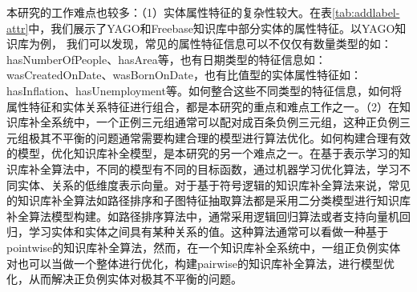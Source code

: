 本研究的工作难点也较多：（1）实体属性特征的复杂性较大。在表\ref{tab:addlabel-attr}中，我们展示了YAGO和Freebase知识库中部分实体的属性特征。以YAGO知识库为例，
我们可以发现，常见的属性特征信息可以不仅仅有数量类型的如：hasNumberOfPeople、hasArea等，也有日期类型的特征信息如：wasCreatedOnDate、wasBornOnDate，也有比值型的实体属性特征如：hasInflation、hasUnemployment等。如何整合这些不同类型的特征信息，如何将属性特征和实体关系特征进行组合，都是本研究的重点和难点工作之一。（2）在知识库补全系统中，一个正例三元组通常可以配对成百条负例三元组，这种正负例三元组极其不平衡的问题通常需要构建合理的模型进行算法优化。如何构建合理有效的模型，优化知识库补全模型，是本研究的另一个难点之一。在基于表示学习的知识库补全算法中，不同的模型有不同的目标函数，通过机器学习优化算法，学习不同实体、关系的低维度表示向量。对于基于符号逻辑的知识库补全算法来说，常见的知识库补全算法如路径排序和子图特征抽取算法都是采用二分类模型进行知识库补全算法模型构建。如路径排序算法中，通常采用逻辑回归算法或者支持向量机回归，学习实体和实体之间具有某种关系的值。这种算法通常可以看做一种基于pointwise的知识库补全算法，然而，在一个知识库补全系统中，一组正负例实体对也可以当做一个整体进行优化，构建pairwise的知识库补全算法，进行模型优化，从而解决正负例实体对极其不平衡的问题。



